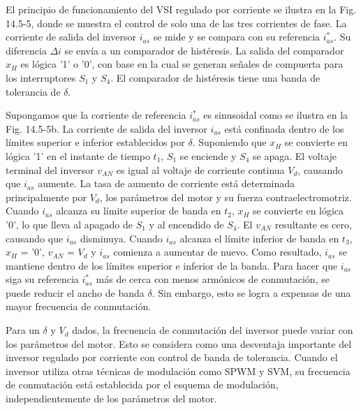 \documentclass[letterpaper,12pt]{article}
\begin{document}
El principio de funcionamiento del VSI regulado por corriente se ilustra en la Fig. 14.5-5, donde se muestra el control de solo una de las tres corrientes de fase. La corriente de salida del inversor $i_{as}$ se mide y se compara con su referencia $i_{as}^*$. Su diferencia $\Delta i$ se envía a un comparador de histéresis. La salida del comparador $x_H$ es lógica '1' o '0', con base en la cual se generan señales de compuerta para los interruptores $S_1$ y $S_4$. El comparador de histéresis tiene una banda de tolerancia de $\delta$.

\clearpage
Supongamos que la corriente de referencia $i_{as}^*$ es sinusoidal como se ilustra en la Fig. 14.5-5b. La corriente de salida del inversor $i_{as}$ está confinada dentro de los límites superior e inferior establecidos por $\delta$. Suponiendo que $x_H$ se convierte en lógica '1' en el instante de tiempo $t_1$, $S_1$ se enciende y $S_4$ se apaga. El voltaje terminal del inversor $v_{AN}$ es igual al voltaje de corriente continua $V_d$, causando que $i_{as}$ aumente. La tasa de aumento de corriente está determinada principalmente por $V_d$, los parámetros del motor y su fuerza contraelectromotriz. Cuando $i_{as}$ alcanza su límite superior de banda en $t_2$, $x_H$ se convierte en lógica '0', lo que lleva al apagado de $S_1$ y al encendido de $S_4$. El $v_{AN}$ resultante es cero, causando que $i_{as}$ disminuya. Cuando $i_{as}$ alcanza el límite inferior de banda en $t_3$, $x_H$ = '0', $v_{AN}$ = $V_d$ y $i_{as}$ comienza a aumentar de nuevo. Como resultado, $i_{as}$ se mantiene dentro de los límites superior e inferior de la banda. Para hacer que $i_{as}$ siga su referencia $i_{as}^*$ más de cerca con menos armónicos de conmutación, se puede reducir el ancho de banda $\delta$. Sin embargo, esto se logra a expensas de una mayor frecuencia de conmutación.

Para un $\delta$ y $V_d$ dados, la frecuencia de conmutación del inversor puede variar con los parámetros del motor. Esto se considera como una desventaja importante del inversor regulado por corriente con control de banda de tolerancia. Cuando el inversor utiliza otras técnicas de modulación como SPWM y SVM, su frecuencia de conmutación está establecida por el esquema de modulación, independientemente de los parámetros del motor.
\end{document}
